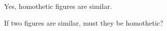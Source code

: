 











Yes, homothetic figures are similar.

If two figures are similar, must they be homothetic?














